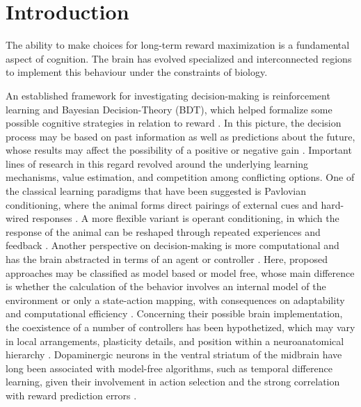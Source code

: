 \section{Introduction}

The ability to make choices for long-term reward maximization is a fundamental aspect of cognition. The brain has evolved specialized and interconnected regions to implement this behaviour under the constraints of biology.

An established framework for investigating decision-making is reinforcement learning and Bayesian Decision-Theory (BDT), which helped formalize some possible cognitive strategies in relation to reward \cite{suttonReinforcementLearningProblem1998}.
In this picture, the decision process may be based on past information as well as predictions about the future, whose results may affect the possibility of a positive or negative gain \cite{dayanDecisionTheoryReinforcement2008}.
Important lines of research in this regard revolved around the underlying learning mechanisms, value estimation, and competition among conflicting options.
One of the classical learning paradigms that have been suggested is Pavlovian conditioning, where the animal forms direct pairings of external cues and hard-wired responses \cite{allenCloserLookClassical1985}.
A more flexible variant is operant conditioning, in which the response of the animal can be reshaped through repeated experiences and feedback \cite{baldassarreClassicalInstrumentalConditioning}.
Another perspective on decision-making is more computational and has the brain abstracted in terms of an agent or controller \cite{dayanDecisionTheoryReinforcement2008}.
Here, proposed approaches may be classified as model based or model free, whose main difference is whether the calculation of the behavior involves an internal model of the environment or only a state-action mapping, with consequences on adaptability and computational efficiency \cite{suttonReinforcementLearningProblem1998}.
Concerning their possible brain implementation, the coexistence of a number of controllers has been hypothetized, which may vary in local arrangements, plasticity details, and position within a neuroanatomical hierarchy \cite{bachAlgorithmsSurvivalComparative2017}.
 Dopaminergic neurons in the ventral striatum of the midbrain have long been associated with model-free algorithms, such as temporal difference learning, given their involvement in action selection and the strong correlation with reward prediction errors \cite{suriTDModelsReward2002, nivDopamineUncertaintyTD2005, schultzDopamineRewardPrediction2016}.
